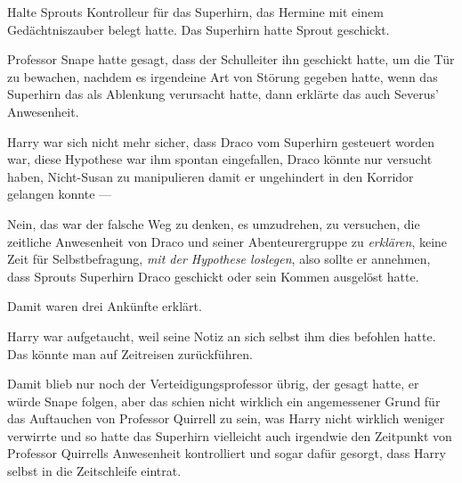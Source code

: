 Halte Sprouts Kontrolleur für das Superhirn, das Hermine mit einem Gedächtniszauber belegt hatte. Das Superhirn hatte Sprout geschickt.

Professor Snape hatte gesagt, dass der Schulleiter ihn geschickt hatte, um die Tür zu bewachen, nachdem es irgendeine Art von Störung gegeben hatte, wenn das Superhirn das als Ablenkung verursacht hatte, dann erklärte das auch Severus’ Anwesenheit.

Harry war sich nicht mehr sicher, dass Draco vom Superhirn gesteuert worden war, diese Hypothese war ihm spontan eingefallen, Draco könnte nur versucht haben, Nicht-Susan zu manipulieren damit er ungehindert in den Korridor gelangen konnte —

Nein, das war der falsche Weg zu denken, es umzudrehen, zu versuchen, die zeitliche Anwesenheit von Draco und seiner Abenteurergruppe zu \emph{erklären}, keine Zeit für Selbstbefragung, \emph{mit der Hypothese loslegen}, also sollte er annehmen, dass Sprouts Superhirn Draco geschickt oder sein Kommen ausgelöst hatte.

Damit waren drei Ankünfte erklärt.

Harry war aufgetaucht, weil seine Notiz an sich selbst ihm dies befohlen hatte. Das könnte man auf Zeitreisen zurückführen.

Damit blieb nur noch der Verteidigungsprofessor übrig, der gesagt hatte, er würde Snape folgen, aber das schien nicht wirklich ein angemessener Grund für das Auftauchen von Professor Quirrell zu sein, was Harry nicht wirklich weniger verwirrte und so hatte das Superhirn vielleicht auch irgendwie den Zeitpunkt von Professor Quirrells Anwesenheit kontrolliert und sogar dafür gesorgt, dass Harry selbst in die Zeitschleife eintrat.

